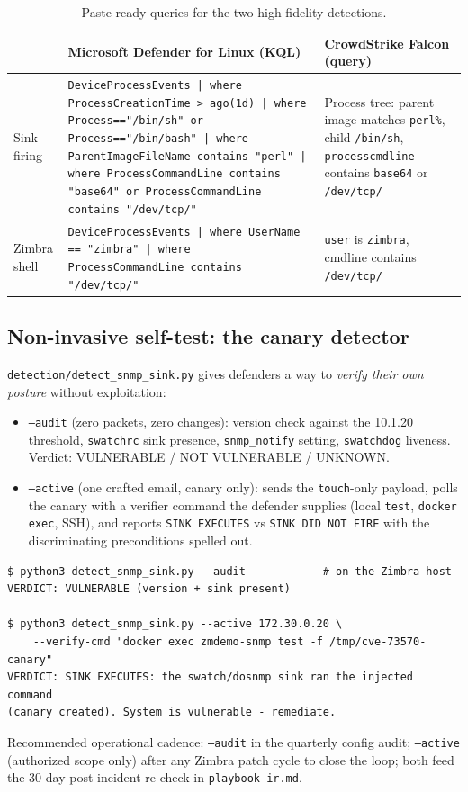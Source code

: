 \begin{table}[t]
\centering
\footnotesize
\begin{tabular}{p{4.2cm}p{7.2cm}p{4.2cm}}
\toprule
 & Microsoft Defender for Linux (KQL) & CrowdStrike Falcon (query) \\
\midrule
Sink firing &
  \texttt{DeviceProcessEvents | where ProcessCreationTime > ago(1d) | where
  Process=="/bin/sh" or Process=="/bin/bash" | where ParentImageFileName
  contains "perl" | where ProcessCommandLine contains "base64" or
  ProcessCommandLine contains "/dev/tcp/"} &
  Process tree: parent image matches \texttt{perl\%}, child
  \texttt{/bin/sh}, \texttt{processcmdline} contains \texttt{base64}
  or \texttt{/dev/tcp/} \\
Zimbra shell &
  \texttt{DeviceProcessEvents | where UserName == "zimbra" | where
  ProcessCommandLine contains "/dev/tcp/"} &
  \texttt{user} is \texttt{zimbra}, cmdline contains \texttt{/dev/tcp/} \\
\bottomrule
\end{tabular}
\caption{Paste-ready queries for the two high-fidelity detections.}
\label{tab:edr}
\end{table}

\subsection{Non-invasive self-test: the canary detector}

\texttt{detection/detect\_snmp\_sink.py} gives defenders a way to
\emph{verify their own posture} without exploitation:
\begin{itemize}
\item \texttt{--audit} (zero packets, zero changes): version check against
      the 10.1.20 threshold, \texttt{swatchrc} sink presence,
      \texttt{snmp\_notify} setting, \texttt{swatchdog} liveness. Verdict:
      VULNERABLE / NOT VULNERABLE / UNKNOWN.
\item \texttt{--active} (one crafted email, canary only): sends the
      \texttt{touch}-only payload, polls the canary with a verifier command
      the defender supplies (local \texttt{test}, \texttt{docker exec},
      SSH), and reports \texttt{SINK EXECUTES} vs \texttt{SINK DID NOT
      FIRE} with the discriminating preconditions spelled out.
\end{itemize}

\begin{lstlisting}[style=shell,caption={Detector output on the stock lab (real run)}]
$ python3 detect_snmp_sink.py --audit            # on the Zimbra host
VERDICT: VULNERABLE (version + sink present)

$ python3 detect_snmp_sink.py --active 172.30.0.20 \
    --verify-cmd "docker exec zmdemo-snmp test -f /tmp/cve-73570-canary"
VERDICT: SINK EXECUTES: the swatch/dosnmp sink ran the injected command
(canary created). System is vulnerable - remediate.
\end{lstlisting}

Recommended operational cadence: \texttt{--audit} in the quarterly config
audit; \texttt{--active} (authorized scope only) after any Zimbra patch
cycle to close the loop; both feed the 30-day post-incident re-check in
\texttt{playbook-ir.md}.

